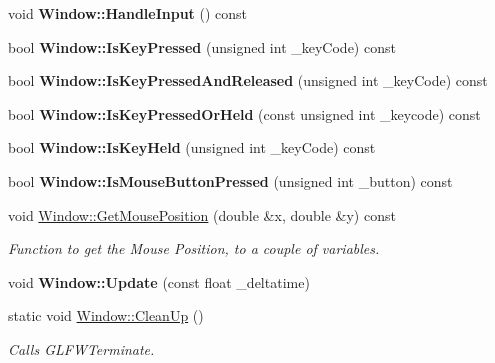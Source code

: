 \begin{DoxyCompactItemize}
void {\bfseries Window\+::\+Handle\+Input} () const
\item 
\mbox{\label{group___getters_ga72708934a1134a2ad9729f45719902a7}} 
bool {\bfseries Window\+::\+Is\+Key\+Pressed} (unsigned int \+\_\+key\+Code) const
\item 
\mbox{\label{group___getters_ga4000d4a6212d66cb1b14023cfb68c3a0}} 
bool {\bfseries Window\+::\+Is\+Key\+Pressed\+And\+Released} (unsigned int \+\_\+key\+Code) const
\item 
\mbox{\label{group___getters_ga78186413fc84fbb83f1c5c8a230d45fa}} 
bool {\bfseries Window\+::\+Is\+Key\+Pressed\+Or\+Held} (const unsigned int \+\_\+keycode) const
\item 
\mbox{\label{group___getters_ga2d13c2ec079ed3f8e907969781217c93}} 
bool {\bfseries Window\+::\+Is\+Key\+Held} (unsigned int \+\_\+key\+Code) const
\item 
\mbox{\label{group___getters_ga174de5939a61138e7c3cfe0136716f01}} 
bool {\bfseries Window\+::\+Is\+Mouse\+Button\+Pressed} (unsigned int \+\_\+button) const
\item 
void \mbox{\hyperlink{group___getters_ga65b02b0e52540d4c2c9d13689f4ec45a}{Window\+::\+Get\+Mouse\+Position}} (double \&x, double \&y) const
\begin{DoxyCompactList}\small\item\em Function to get the Mouse Position, to a couple of variables. \end{DoxyCompactList}\item 
\mbox{\label{group___getters_ga86a9ed5f891a93f0c3c44d8577be4e71}} 
void {\bfseries Window\+::\+Update} (const float \+\_\+deltatime)
\item 
\mbox{\label{group___getters_gab0d4c2fa778638e6fde90fc221124384}} 
static void \mbox{\hyperlink{group___getters_gab0d4c2fa778638e6fde90fc221124384}{Window\+::\+Clean\+Up}} ()
\begin{DoxyCompactList}\small\item\em Calls G\+L\+F\+W\+Terminate. \end{DoxyCompactList}\end{DoxyCompactItemize}
